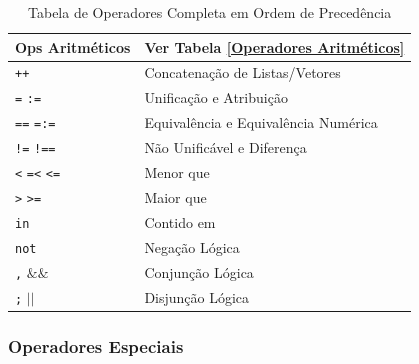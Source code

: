 \begin{frame}[fragile]

\begin{footnotesize}

	\begin{table}
		\caption{Tabela de Operadores Completa em Ordem de Precedência}
		\begin{center}
			\begin{tabular}{ p{2cm}| p{5cm} } \hline
				Ops Aritméticos & Ver Tabela \ref{Operadores Aritméticos}\\ \hline
				\verb-++-  & Concatenação de Listas/Vetores \\ \hline 
				\verb+=+  \verb+:=+  & Unificação e Atribuição\\ \hline
				\verb+==+ \verb+=:=+ & Equivalência e Equivalência Numérica\\ \hline
				\verb+!=+ \verb+!==+ & Não Unificável e Diferença\\ \hline
				\verb+<+  \verb+=<+ \verb+<=+ & Menor que\\ \hline
				\verb+>+  \verb+>=+ & Maior que\\ \hline
				\verb+in+ & Contido em\\ \hline
				\verb+not+ & Negação Lógica \\ \hline 
				\verb+,+  $\&\&$ & Conjunção Lógica \\ \hline 
				\verb+;+  $|$$|$ & Disjunção Lógica \\ \hline 
			\end{tabular}
		\end{center}
	\end{table}

\end{footnotesize}

\end{frame}


\subsubsection{Operadores Especiais}

